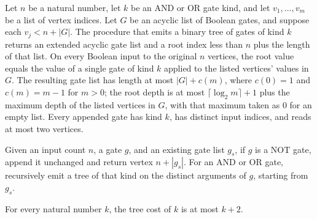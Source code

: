 \begin{theorem}
\label{BoolCircuit.emitTree_spec}
\leanok
{}
Let $n$ be a natural number, let $k$ be an AND or OR gate kind, and let $v_1,\ldots,v_m$
be a list of vertex indices. Let $G$ be an acyclic list of Boolean gates, and suppose
each $v_j<n+|G|$. The procedure that emits a binary tree of gates of kind $k$ returns an
extended acyclic gate list and a root index less than $n$ plus the length of that list.
On every Boolean input to the original $n$ vertices, the root value equals the value of
a single gate of kind $k$ applied to the listed vertices' values in $G$. The resulting
gate list has length at most $|G|+c(m)$, where $c(0)=1$ and $c(m)=m-1$ for $m>0$; the
root depth is at most $\lceil\log_2 m\rceil+1$ plus the maximum depth of the listed
vertices in $G$, with that maximum taken as $0$ for an empty list. Every appended gate
has kind $k$, has distinct input indices, and reads at most two vertices.
\end{theorem}

\begin{definition}
\label{BoolCircuit.binarizeGadget}
\leanok
{}
Given an input count $n$, a gate $g$, and an existing gate list $g_s$, if $g$ is a NOT
gate, append it unchanged and return vertex $n+|g_s|$. For an AND or OR gate,
recursively emit a tree of that kind on the distinct arguments of $g$, starting from
$g_s$.
\end{definition}

\begin{theorem}
\label{BoolCircuit.treeCost_le}
\leanok
{}
For every natural number $k$, the tree cost of $k$ is at most $k+2$.
\end{theorem}


